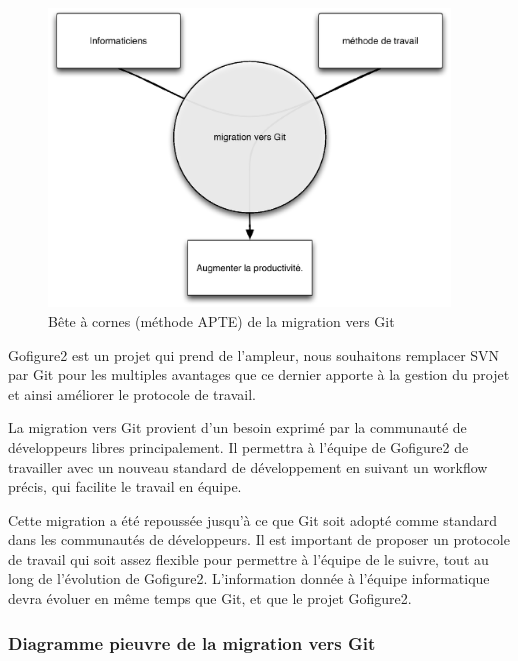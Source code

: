 \begin{figure}[h]
\begin{center}
\leavevmode
\includegraphics[width=0.95\textwidth]{pictures/GitBAC}
\end{center}
\caption{Bête à cornes (méthode {APTE\textregistered}) de la migration vers Git}
\label{fig:BACGit}
\end{figure}

Gofigure2 est un projet qui prend de l'ampleur,
nous souhaitons remplacer SVN par Git pour les multiples avantages
que ce dernier apporte à la gestion du projet et ainsi améliorer le protocole de travail.

La migration vers Git provient d'un besoin exprimé par la communauté de développeurs libres principalement.
Il permettra à l'équipe de Gofigure2 de travailler 
avec un nouveau standard de développement en suivant un workflow précis, qui facilite le travail en équipe.

Cette migration a été repoussée jusqu'à ce que Git soit adopté comme standard dans les communautés de développeurs.
Il est important de proposer un protocole de travail qui soit assez flexible pour permettre à l'équipe de le suivre,
tout au long de l'évolution de Gofigure2.
L'information donnée à l'équipe informatique devra évoluer en même temps que Git, et que le projet Gofigure2.


\subsubsection*{Diagramme pieuvre de la migration vers Git}

